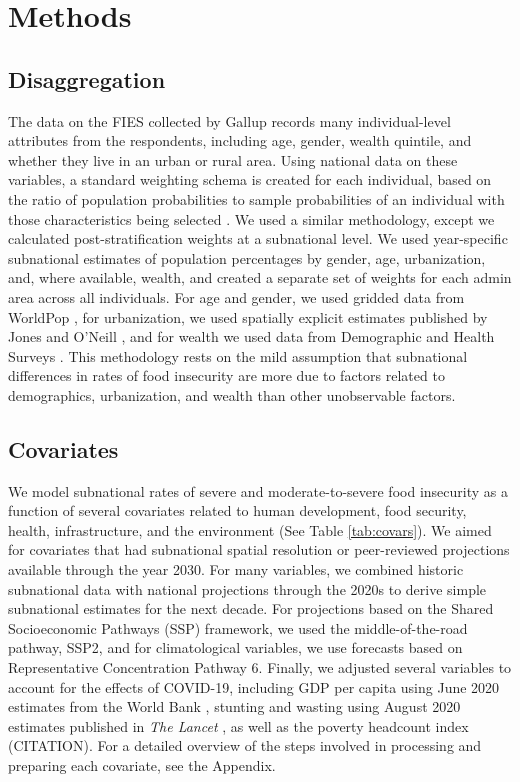 \documentclass{article}
\begin{document}
\section{Methods}

\subsection{Disaggregation}
The data on the FIES collected by Gallup records many individual-level attributes from the respondents, including age, gender, wealth quintile, and whether they live in an urban or rural area.  Using national data on these variables, a standard weighting schema is created for each individual, based on the ratio of population probabilities to sample probabilities of an individual with those characteristics being selected \citep{bethlehem2009applied}.  We used a similar methodology, except we calculated post-stratification weights at a subnational level.  We used year-specific subnational estimates of population percentages by gender, age, urbanization, and, where available, wealth, and created a separate set of weights for each admin area across all individuals.  For age and gender, we used gridded data from WorldPop \citep{Tatem2017}, for urbanization, we used spatially explicit estimates published by Jones and O'Neill \citep{Jones2016}, and for wealth we used data from Demographic and Health Surveys \citep{dhsall}.  This methodology rests on the mild assumption that subnational differences in rates of food insecurity are more due to factors related to demographics, urbanization, and wealth than other unobservable factors.

\subsection{Covariates}
We model subnational rates of severe and moderate-to-severe food insecurity as a function of several covariates related to human development, food security, health, infrastructure, and the environment (See Table \ref{tab:covars}).  We aimed for covariates that had subnational spatial resolution or peer-reviewed projections available through the year 2030.  For many variables, we combined historic subnational data with national projections through the 2020s to derive simple subnational estimates for the next decade.  For projections based on the Shared Socioeconomic Pathways (SSP) framework, we used the middle-of-the-road pathway, SSP2, and for climatological variables, we use forecasts based on Representative Concentration Pathway 6.  Finally, we adjusted several variables to account for the effects of COVID-19, including GDP per capita using June 2020 estimates from the World Bank \citep{prospects2020}, stunting and wasting using August 2020 estimates published in \textit{The Lancet} \citep{headey2020impacts}, as well as the poverty headcount index (CITATION).  For a detailed overview of the steps involved in processing and preparing each covariate, see the Appendix.
\end{document}
